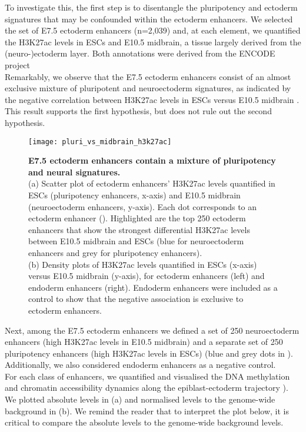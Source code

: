 To investigate this, the first step is to disentangle the pluripotency and ectoderm signatures that may be confounded within the ectoderm enhancers. We selected the set of E7.5 ectoderm enhancers (n=2,039) and, at each element, we quantified the H3K27ac levels in ESCs and E10.5 midbrain, a tissue largely derived from the (neuro-)ectoderm layer. Both annotations were derived from the ENCODE project\cite{Feng2014}\\
Remarkably, we observe that the E7.5 ectoderm enhancers consist of an almost exclusive mixture of pluripotent and neuroectoderm signatures, as indicated by the negative correlation between H3K27ac levels in ESCs versus E10.5 midbrain . This result supports the first hypothesis, but does not rule out the second hypothesis.

\begin{figure}[H]
	\centering
	\texttt{[image: pluri\_vs\_midbrain\_h3k27ac]}
	\caption[]{
	\textbf{E7.5 ectoderm enhancers contain a mixture of pluripotency and neural signatures.}\\
	(a) Scatter plot of ectoderm enhancers' H3K27ac levels quantified in ESCs (pluripotency enhancers, x-axis) and E10.5 midbrain (neuroectoderm enhancers, y-axis). Each dot corresponds to an ectoderm enhancer (). Highlighted are the top 250 ectoderm enhancers that show the strongest differential H3K27ac levels between E10.5 midbrain and ESCs (blue for neuroectoderm enhancers and grey for pluripotency enhancers). \\
	(b)	Density plots of H3K27ac levels quantified in ESCs (x-axis) versus E10.5 midbrain (y-axis), for ectoderm enhancers (left) and endoderm enhancers (right). Endoderm enhancers were included as a control to show that the negative association is exclusive to ectoderm enhancers.
	}
	\label{fig:pluri_vs_midbrain_h3k27ac}
\end{figure}

Next, among the E7.5 ectoderm enhancers we defined a set of 250 neuroectoderm enhancers (high H3K27ac levels in E10.5 midbrain) and a separate set of 250 pluripotency enhancers (high H3K27ac levels in ESCs) (blue and grey dots in ). Additionally, we also considered endoderm enhancers as a negative control.\\
For each class of enhancers, we quantified and visualised the DNA methylation and chromatin accessibility dynamics along the epiblast-ectoderm trajectory ). We plotted absolute levels in (a) and normalised levels to the genome-wide background in (b). We remind the reader that to interpret the plot below, it is critical to compare the absolute levels to the genome-wide background levels.


